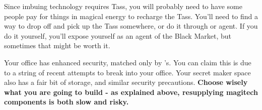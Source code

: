 \documentclass[green]{GL2020}
\begin{document}
Since imbuing technology requires Tass, you will probably need to have some people pay for things in magical energy to recharge the Tass. You’ll need to find a way to drop off and pick up the Tass somewhere, or do it through \cChupSecond{} or \cChupSecond{\their} agent. If you do it yourself, you’ll expose yourself as an agent of the Black Market, but sometimes that might be worth it.

Your office has enhanced security, matched only by \cPrincipal{}'s. You can claim this is due to a string of recent attempts to break into your office. Your secret maker space also has a fair bit of storage, and similar security precautions. \textbf{Choose wisely what you are going to build - as explained above, resupplying magitech components is both slow and risky.}
\end{document}
